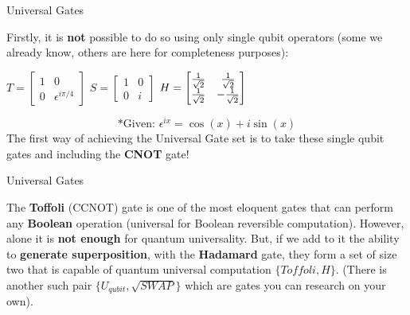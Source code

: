 \documentclass[aspectratio=43]{beamer}
\begin{document}
\begin{frame}{\q Universal Gates}
\begin{cardTiny}
Firstly, it is \textbf{not} possible to do so using only single qubit operators (some we already know, others are here for completeness purposes):
    \begin{multicols}{2}
$T = \begin{bmatrix}1 & 0\\ 0 & \epsilon^{i\pi/4} \end{bmatrix}$
$S = \begin{bmatrix}1 & 0\\ 0 & i \end{bmatrix}$
$H = \begin{bmatrix}\frac{1}{\sqrt{2}}  & \frac{1}{\sqrt{2}} \\ \frac{1}{\sqrt{2}}  & -\frac{1}{\sqrt{2}} \end{bmatrix}$
    \end{multicols}
    \begin{equation*}
        \text{*Given: }\epsilon^{ix} = \cos(x) + i\sin(x)
    \end{equation*}
The first way of achieving the Universal Gate set is to take these single qubit gates and including the \textbf{CNOT} gate!
\end{cardTiny}
\pagenumber
\end{frame}

\begin{frame}{\q Universal Gates}
\begin{card}
The \textbf{Toffoli} (CCNOT) gate is one of the most eloquent gates that can perform any \textbf{Boolean} operation (universal for Boolean reversible computation). However, alone it is \textbf{not enough} for quantum universality. But, if we add to it the ability to \textbf{generate superposition}, with the \textbf{Hadamard} gate, they form a set of size two that is capable of quantum universal computation $\{Toffoli, H\}$. (There is another such pair $\{U_{qubit}, \sqrt{SWAP}\}$ which are gates you can research on your own). 
\end{card}
\pagenumber
\end{frame}
\end{document}
